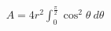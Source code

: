 \documentclass[preview]{standalone}
\begin{document}
\begin{align*}
A=4r^{2}\int_{0}^{\frac{\pi}{2}}\cos^{2}\theta\ d\theta
\end{align*}
\end{document}
